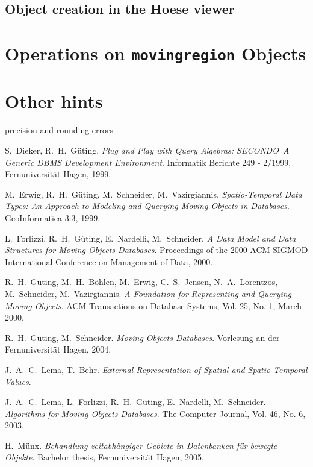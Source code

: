 \documentclass[a4paper,12pt]{article}
\newcommand{\secondo}{{\scshape SE\-CON\-DO}}
\begin{document}
\subsection{Object creation in the Hoese viewer}

\section{Operations on {\tt movingregion} Objects}
\label{operations}

\section{Other hints}

precision and rounding errors

\begin{thebibliography}{\hspace{2cm}}

  S.\ Dieker, R.\ H.\ G\"{u}ting.
  \textsl{Plug and Play with Query Algebras: \secondo\ A Generic DBMS
    Development Environment}.
  Informatik Berichte 249 - 2/1999, Fernuniversit\"{a}t Hagen, 1999.

  M.\ Erwig, R.\ H.\ G\"{u}ting, M.\ Schneider, M.\ Vazirgiannis.
  \textsl{Spatio-Temporal Data Types: An Approach to Modeling and
    Querying Moving Objects in Databases}.
  GeoInformatica 3:3, 1999.

  L.\ Forlizzi, R.\ H.\ G\"{u}ting, E.\ Nardelli, M.\ Schneider.
  \textsl{A Data Model and Data Structures for Moving Objects Databases}.
  Proceedings of the 2000 ACM SIGMOD International Conference on Management
  of Data, 2000.
  
  R.\ H.\ G\"{u}ting, M.\ H.\ B\"{o}hlen, M.\ Erwig, C.\ S.\ Jensen,
  N.\ A.\ Lorentzos, M.\ Schneider, M.\ Vazirgiannis.
  \textsl{A Foundation for Representing and Querying Moving Objects}.
  ACM Transactions on Database Systems, Vol. 25, No. 1, March 2000.

  R.\ H.\ G\"{u}ting, M.\ Schneider.
  \textsl{Moving Objects Databases}.
  Vorlesung an der Fernuniversit\"{a}t Hagen, 2004.

  J.\ A.\ C.\ Lema, T.\ Behr.
  \textsl{External Representation of Spatial and Spatio-Temporal Values}.

  J.\ A.\ C.\ Lema, L.\ Forlizzi, R.\ H.\ G\"{u}ting, E.\ Nardelli,
  M.\ Schneider.
  \textsl{Algorithms for Moving Objects Databases}.
  The Computer Journal, Vol. 46, No. 6, 2003.

  H.\ M\"{u}nx.
  \textsl{Behandlung zeitabh\"{a}ngiger Gebiete in Datenbanken
    f\"{u}r bewegte Objekte}.
  Bachelor thesis, Fernuniversit\"{a}t Hagen, 2005.

\end{thebibliography}
\end{document}
